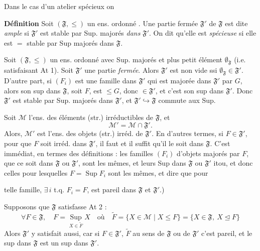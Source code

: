 \documentclass[11pt,a4paper]{article}
\begin{document}

Dans le cas d'un atelier spécieux on \ill{}

\textbf{Définition} Soit $(\mathfrak{F}, \leq)$ un ens. ordonné . Une partie \struck{\ill{}} fermée $\mathfrak{F}'$ de $\mathfrak{F}$ est dite \emph{ample} si $\mathfrak{F}'$ est stable  par Sup. majorés \emph{dans} $\mathfrak{F}'$. On dit qu'elle est \emph{spécieuse} si elle est  $=$ stable par Sup majorés dans $\mathfrak{F}$.

Soit $(\mathfrak{F}, \leq)$ un ens. ordonné  avec Sup. majorés et plus petit élément $\emptyset_{\mathfrak{F}}$ (i.e. satisfaisant At 1). Soit $\mathfrak{F}'$ une partie \emph{fermée}. Alors  $\mathfrak{F}'$ est non vide ssi $\emptyset_{\mathfrak{F}} \in \mathfrak{F}'$. D'autre part, si $(F_i)$ est une famille dans $\mathfrak{F}'$ qui est majorée dans $\mathfrak{F}'$ par $G$, alors son sup dans $\mathfrak{F}$, soit $F$, est $\leq G$, donc $\in \mathfrak{F}'$, et c'est son sup dans $\mathfrak{F}'$. Donc $\mathfrak{F}'$  est stable par Sup. majorés dans $\mathfrak{F}'$, et $\mathfrak{F}' \hookrightarrow \mathfrak{F}$ commute aux Sup.

Soit $\mathcal{M}$ l'ens. des éléments (str.) irréductibles de $\mathfrak{F}$, et
\[
  \mathcal{M}' = \mathcal{M} \cap \mathfrak{F}' .
\]
Alors, $\mathcal{M}'$ est l'ens. des objets (str.) irréd. de $\mathfrak{F}'$. En d'autres termes, si $F \in \mathfrak{F}'$, pour que $F$ soit irréd. dans $\mathfrak{F}'$, il faut et il suffit qu'il le soit dans $\mathfrak{F}$. C'est immédiat, en termes des définitions : les familles $(F_i)$ d'objets majorés par $F$, que ce soit dans $\mathfrak{F}$ ou $\mathfrak{F}'$, sont les mêmes, et leurs Sup dans $\mathfrak{F}$ ou $\mathfrak{F}'$ itou, et donc celles pour lesquelles $F = \operatorname{Sup} F_i$ sont les mêmes, et dire que pour

telle famille, $\exists\, i$ t.q. $F_i = F$, est  pareil dans $\mathfrak{F}$ et $\mathfrak{F}'$.)

Supposons que $\mathfrak{F}$ satisfasse At 2 :
\[
  \forall F \in \mathfrak{F}, \quad F = \operatorname*{Sup}_{X \in \widetilde{F}} X \quad \text{où} \quad \widetilde{F} = \lbrace X \in \mathcal{M} \mid X \leq F \rbrace = \lbrace X \in \mathfrak{F},\ X \trianglelefteq F \rbrace
\]
Alors $\mathfrak{F}'$ y satisfait aussi, car si $F \in \mathfrak{F}'$, $\widetilde{F}$ au sens de $\mathfrak{F}$ ou de $\mathfrak{F}'$ c'est pareil, et le sup dans $\mathfrak{F}$ est un sup dans $\mathfrak{F}'$.
\end{document}
